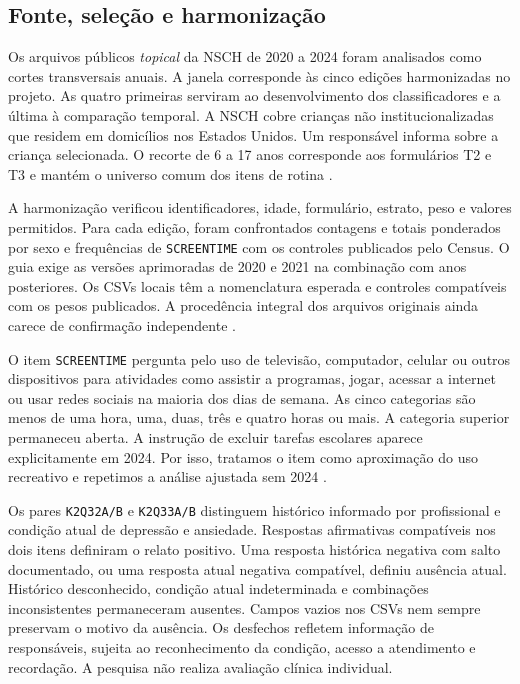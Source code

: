 ﻿\documentclass[12pt]{article}
\begin{document}
\subsection{Fonte, seleção e harmonização}
Os arquivos públicos \textit{topical} da NSCH de 2020 a 2024 foram analisados como cortes transversais anuais. A janela corresponde às cinco edições harmonizadas no projeto. As quatro primeiras serviram ao desenvolvimento dos classificadores e a última à comparação temporal. A NSCH cobre crianças não institucionalizadas que residem em domicílios nos Estados Unidos. Um responsável informa sobre a criança selecionada. O recorte de 6 a 17 anos corresponde aos formulários T2 e T3 e mantém o universo comum dos itens de rotina \cite{census2020,census2021,census2022,census2023,census2024,censusaccuracy2024}.

A harmonização verificou identificadores, idade, formulário, estrato, peso e valores permitidos. Para cada edição, foram confrontados contagens e totais ponderados por sexo e frequências de \texttt{SCREENTIME} com os controles publicados pelo Census. O guia exige as versões aprimoradas de 2020 e 2021 na combinação com anos posteriores. Os CSVs locais têm a nomenclatura esperada e controles compatíveis com os pesos publicados. A procedência integral dos arquivos originais ainda carece de confirmação independente \cite{censusguide}.

O item \texttt{SCREENTIME} pergunta pelo uso de televisão, computador, celular ou outros dispositivos para atividades como assistir a programas, jogar, acessar a internet ou usar redes sociais na maioria dos dias de semana. As cinco categorias são menos de uma hora, uma, duas, três e quatro horas ou mais. A categoria superior permaneceu aberta. A instrução de excluir tarefas escolares aparece explicitamente em 2024. Por isso, tratamos o item como aproximação do uso recreativo e repetimos a análise ajustada sem 2024 \cite{census2020,census2021,census2022,census2023,census2024}.

Os pares \texttt{K2Q32A/B} e \texttt{K2Q33A/B} distinguem histórico informado por profissional e condição atual de depressão e ansiedade. Respostas afirmativas compatíveis nos dois itens definiram o relato positivo. Uma resposta histórica negativa com salto documentado, ou uma resposta atual negativa compatível, definiu ausência atual. Histórico desconhecido, condição atual indeterminada e combinações inconsistentes permaneceram ausentes. Campos vazios nos CSVs nem sempre preservam o motivo da ausência. Os desfechos refletem informação de responsáveis, sujeita ao reconhecimento da condição, acesso a atendimento e recordação. A pesquisa não realiza avaliação clínica individual.
\end{document}

